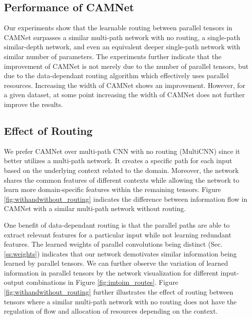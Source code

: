 \documentclass[10pt,twocolumn,letterpaper]{article}
\begin{document}
\subsection{Performance of CAMNet}
\label{ss:performance_camnet}
\vspace{-0.05in}
Our experiments show that the learnable routing between parallel tensors in CAMNet surpasses a similar multi-path network with no routing, a single-path similar-depth network, and even an equivalent deeper single-path network with similar number of parameters. The experiments further indicate that the improvement of CAMNet is not merely due to the number of parallel tensors, but due to the data-dependant routing algorithm which effectively uses  parallel resources. Increasing the width of CAMNet shows an improvement. However, for a given dataset, at some point increasing the width of CAMNet does not further improve the results.  


\subsection{Effect of Routing}
\label{ss:effect of routing}
\vspace{-0.05in}
We prefer CAMNet over multi-path CNN with no routing (MultiCNN) since it better utilizes a multi-path network. It creates a specific path for each input based on the underlying context related to the domain. Moreover, the network shares the common features of different contexts while allowing the network to learn more domain-specific features within the remaining tensors. Figure \ref{fig:withandwithout_routing} indicates the difference between information flow in CAMNet with a similar multi-path network without routing. 

One benefit of  data-dependant routing is that the parallel paths are able to extract relevant features for a particular input while not learning redundant features. The learned weights of parallel convolutions being distinct (Sec. \ref{ss:weights}) indicates that our network demotivates similar information being learned by parallel tensors. We can further observe the variation of learned information in parallel tensors by the network visualization for different input-output combinations in Figure \ref{fig:imtoim_routes}. Figure \ref{fig:withandwithout_routing} further illustrates the effect of routing between tensors where a similar multi-path network with no routing does not have the regulation of flow and allocation of resources depending on the context.
\end{document}
